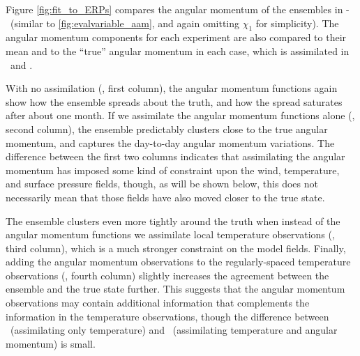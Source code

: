 Figure \ref{fig:fit_to_ERPs} compares the angular momentum of the ensembles in \NODA-\ERPRST~(similar to \ref{fig:evalvariable_aam}, and again omitting $\chi_1$ for simplicity). 
The angular momentum components for each experiment are also compared to their mean and to the ``true'' angular momentum in each case, which is assimilated in \ERPALL ~and \ERPRST.  

With no assimilation (\NODA, first column), the angular momentum functions again show how the ensemble spreads about the truth, and how the spread saturates after about one month.
If we assimilate the angular momentum functions alone (\ERPALL, second column), the ensemble predictably clusters close to the true angular momentum, and captures the day-to-day angular momentum variations. 
The difference between the first two columns indicates that assimilating the angular momentum has imposed some kind of constraint upon the wind, temperature, and surface pressure fields, though, as will be shown below, this does not necessarily mean that those fields have also moved closer to the true state. 

The ensemble clusters even more tightly around the truth when instead of the angular momentum functions we assimilate local temperature observations (\RST, third column), which is a much stronger constraint on the model fields. 
Finally, adding the angular momentum observations to the regularly-spaced temperature observations (\ERPRST, fourth column) slightly increases the agreement between the ensemble and the true state further.  
This suggests that the angular momentum observations may contain additional information that complements the information in the temperature observations, though the difference between \RST ~(assimilating only temperature) and \ERPRST ~(assimilating temperature and angular momentum) is small.  
